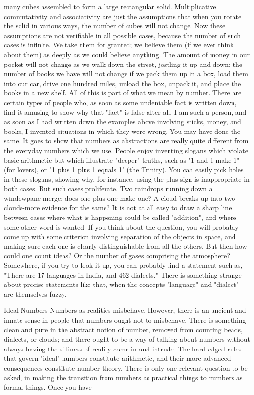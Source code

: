 many cubes assembled to form a large rectangular solid. Multiplicative commutativity and associativity are just the assumptions that when you rotate the solid in various ways, the number of cubes will not change. Now these assumptions are not verifiable in all possible cases, because the number of such cases is infinite. We take them for granted; we believe them (if we ever think about them) as deeply as we could believe anything. The amount of money in our pocket will not change as we walk down the street, jostling it up and down; the number of books we have will not change if we pack them up in a box, load them into our car, drive one hundred miles, unload the box, unpack it, and place the books in a new shelf. All of this is part of what we mean by number. There are certain types of people who, as soon as some undeniable fact is written down, find it amusing to show why that "fact" is false after all. I am such a person, and as soon as I had written down the examples above involving sticks, money, and books, I invented situations in which they were wrong. You may have done the same. It goes to show that numbers as abstractions are really quite different from the everyday numbers which we use. People enjoy inventing slogans which violate basic arithmetic but which illustrate "deeper" truths, such as "1 and 1 make 1" (for lovers), or "1 plus 1 plus 1 equals 1" (the Trinity). You can easily pick holes in those slogans, showing why, for instance, using the plus-sign is inappropriate in both cases. But such cases proliferate. Two raindrops running down a windowpane merge; does one plus one make one? A cloud breaks up into two clouds-more evidence for the same? It is not at all easy to draw a sharp line between cases where what is happening could be called "addition", and where some other word is wanted. If you think about the question, you will probably come up with some criterion involving separation of the objects in space, and making sure each one is clearly distinguishable from all the others. But then how could one count ideas? Or the number of gases comprising the atmosphere? Somewhere, if you try to look it up, you can probably find a statement such as, "There are 17 languages in India, and 462 dialects." There is something strange about precise statements like that, when the concepts "language" and "dialect" are themselves fuzzy. 

Ideal Numbers Numbers as realities misbehave. However, there is an ancient and innate sense in people that numbers ought not to misbehave. There is something clean and pure in the abstract notion of number, removed from counting beads, dialects, or clouds; and there ought to be a way of talking about numbers without always having the silliness of reality come in and intrude. The hard-edged rules that govern "ideal" numbers constitute arithmetic, and their more advanced consequences constitute number theory. There is only one relevant question to be asked, in making the transition from numbers as practical things to numbers as formal things. Once you have 







